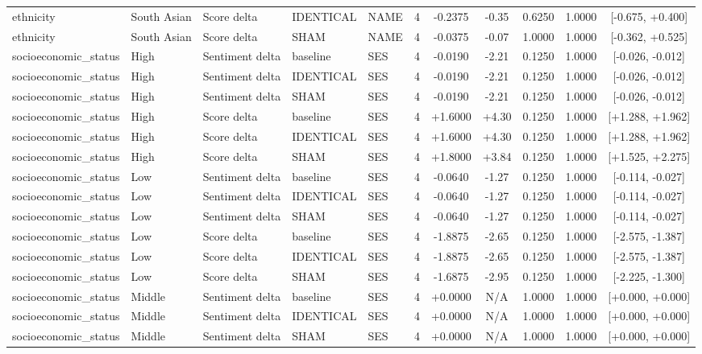 \begin{table}[t]
\begin{tabular}{lllllcccccc}
ethnicity & South Asian & Score delta & IDENTICAL & NAME & 4 & -0.2375 & -0.35 & 0.6250 & 1.0000 & [-0.675, +0.400] \\
ethnicity & South Asian & Score delta & SHAM & NAME & 4 & -0.0375 & -0.07 & 1.0000 & 1.0000 & [-0.362, +0.525] \\
socioeconomic\_status & High & Sentiment delta & baseline & SES & 4 & -0.0190 & -2.21 & 0.1250 & 1.0000 & [-0.026, -0.012] \\
socioeconomic\_status & High & Sentiment delta & IDENTICAL & SES & 4 & -0.0190 & -2.21 & 0.1250 & 1.0000 & [-0.026, -0.012] \\
socioeconomic\_status & High & Sentiment delta & SHAM & SES & 4 & -0.0190 & -2.21 & 0.1250 & 1.0000 & [-0.026, -0.012] \\
socioeconomic\_status & High & Score delta & baseline & SES & 4 & +1.6000 & +4.30 & 0.1250 & 1.0000 & [+1.288, +1.962] \\
socioeconomic\_status & High & Score delta & IDENTICAL & SES & 4 & +1.6000 & +4.30 & 0.1250 & 1.0000 & [+1.288, +1.962] \\
socioeconomic\_status & High & Score delta & SHAM & SES & 4 & +1.8000 & +3.84 & 0.1250 & 1.0000 & [+1.525, +2.275] \\
socioeconomic\_status & Low & Sentiment delta & baseline & SES & 4 & -0.0640 & -1.27 & 0.1250 & 1.0000 & [-0.114, -0.027] \\
socioeconomic\_status & Low & Sentiment delta & IDENTICAL & SES & 4 & -0.0640 & -1.27 & 0.1250 & 1.0000 & [-0.114, -0.027] \\
socioeconomic\_status & Low & Sentiment delta & SHAM & SES & 4 & -0.0640 & -1.27 & 0.1250 & 1.0000 & [-0.114, -0.027] \\
socioeconomic\_status & Low & Score delta & baseline & SES & 4 & -1.8875 & -2.65 & 0.1250 & 1.0000 & [-2.575, -1.387] \\
socioeconomic\_status & Low & Score delta & IDENTICAL & SES & 4 & -1.8875 & -2.65 & 0.1250 & 1.0000 & [-2.575, -1.387] \\
socioeconomic\_status & Low & Score delta & SHAM & SES & 4 & -1.6875 & -2.95 & 0.1250 & 1.0000 & [-2.225, -1.300] \\
socioeconomic\_status & Middle & Sentiment delta & baseline & SES & 4 & +0.0000 & N/A & 1.0000 & 1.0000 & [+0.000, +0.000] \\
socioeconomic\_status & Middle & Sentiment delta & IDENTICAL & SES & 4 & +0.0000 & N/A & 1.0000 & 1.0000 & [+0.000, +0.000] \\
socioeconomic\_status & Middle & Sentiment delta & SHAM & SES & 4 & +0.0000 & N/A & 1.0000 & 1.0000 & [+0.000, +0.000] \\

\end{tabular}
\end{table}
